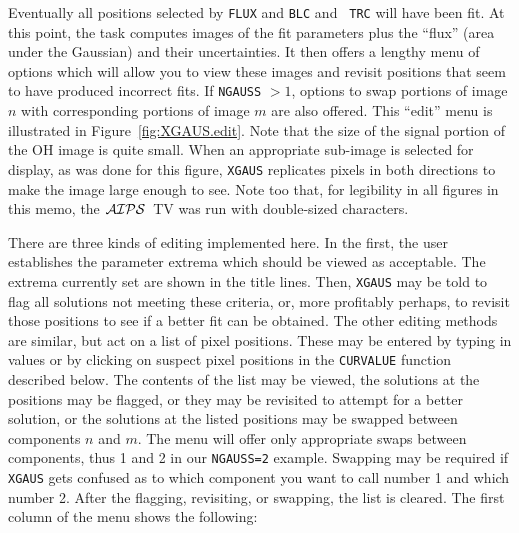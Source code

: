 \documentclass[twoside]{article}
\newcommand{\Me}[1]{\textcolor{mecol}{#1}}
\newcommand{\AIPS}{{$\cal AIPS\/$}}
\begin{document}
Eventually all positions selected by {\tt FLUX} and {\tt BLC} and {\tt
  TRC} will have been fit.  At this point, the task computes images of
the fit parameters plus the ``flux'' (area under the Gaussian) and
their uncertainties.  It then offers a lengthy menu of options which
will allow you to view these images and revisit positions that seem to
have produced incorrect fits.  If {\tt NGAUSS} $> 1$, options to swap
portions of image $n$ with corresponding portions of image $m$ are
also offered.  This ``edit'' menu is illustrated in
Figure~\ref{fig:XGAUS.edit}.  Note that the size of the \Me{signal
  portion of the} OH image is quite small.  \Me{When an appropriate
  sub-image is selected for display, as was done for this figure},
{\tt XGAUS} replicates pixels in both directions to make the image
large enough to see.  Note too that, for legibility in all figures in
this memo, the \AIPS\ TV was run with double-sized characters.

There are three kinds of editing implemented here.  In the first, the
user establishes the parameter extrema which should be viewed as
acceptable.  The extrema currently set are shown in the title lines.
Then, {\tt XGAUS} may be told to flag all solutions not meeting these
criteria, or, more profitably perhaps, to revisit those positions to
see if a better fit can be obtained.  The other editing methods are
similar, but act on a list of pixel positions.  These may be entered
by typing in values or by clicking on suspect pixel positions in the
{\tt CURVALUE} function described below.  The contents of the list may
be viewed, the solutions at the positions may be flagged, or they may
be revisited to attempt for a better solution, or the solutions at the
listed positions may be swapped between components $n$ and $m$.  The
menu will offer only appropriate swaps between components, thus 1 and
2 in our {\tt NGAUSS=2} example.  Swapping may be required if {\tt
  XGAUS} gets confused as to which component you want to call number 1
and which number 2.  After the flagging, revisiting, or swapping, the
list is cleared.    The first column of the menu shows the following:
\end{document}
